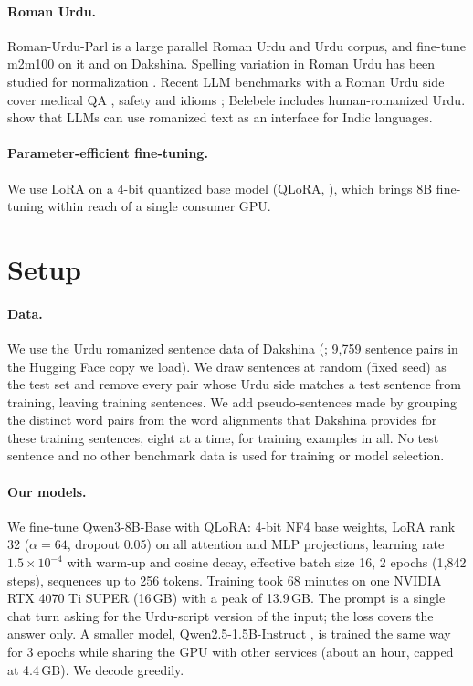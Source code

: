 \documentclass[11pt]{article}
\begin{document}
\paragraph{Roman Urdu.} Roman-Urdu-Parl \citep{alam2022romanurduparl} is a large parallel Roman Urdu and Urdu corpus, and \citet{butt2025translit} fine-tune m2m100 on it and on Dakshina. Spelling variation in Roman Urdu has been studied for normalization \citep{rafae2015unsupervised,khan2022clustering}. Recent LLM benchmarks with a Roman Urdu side cover medical QA \citep{faheem2026umirage}, safety \citep{jamil2026ruab} and idioms \citep{khan2026idioms}; Belebele \citep{bandarkar2024belebele} includes human-romanized Urdu. \citet{husain2024romansetu} show that LLMs can use romanized text as an interface for Indic languages.

\paragraph{Parameter-efficient fine-tuning.} We use LoRA \citep{hu2022lora} on a 4-bit quantized base model (QLoRA, \citealp{dettmers2023qlora}), which brings 8B fine-tuning within reach of a single consumer GPU.

\section{Setup}

\paragraph{Data.} We use the Urdu romanized sentence data of Dakshina (\citealp{roark2020dakshina}; 9{,}759 sentence pairs in the Hugging Face copy we load). We draw \NTest sentences at random (fixed seed) as the test set and remove every pair whose Urdu side matches a test sentence from training, leaving \NTrainSent training sentences. We add \NTrainLex pseudo-sentences made by grouping the distinct word pairs from the word alignments that Dakshina provides for these training sentences, eight at a time, for \NTrainAll training examples in all. No test sentence and no other benchmark data is used for training or model selection.

\paragraph{Our models.} We fine-tune Qwen3-8B-Base \citep{yang2025qwen3} with QLoRA: 4-bit NF4 base weights, LoRA rank 32 ($\alpha=64$, dropout 0.05) on all attention and MLP projections, learning rate $1.5\times10^{-4}$ with warm-up and cosine decay, effective batch size 16, 2 epochs (1{,}842 steps), sequences up to 256 tokens. Training took 68 minutes on one NVIDIA RTX 4070 Ti SUPER (16\,GB) with a peak of 13.9\,GB. The prompt is a single chat turn asking for the Urdu-script version of the input; the loss covers the answer only. A smaller model, Qwen2.5-1.5B-Instruct \citep{qwen2025qwen25}, is trained the same way for 3 epochs while sharing the GPU with other services (about an hour, capped at 4.4\,GB). We decode greedily.
\end{document}
